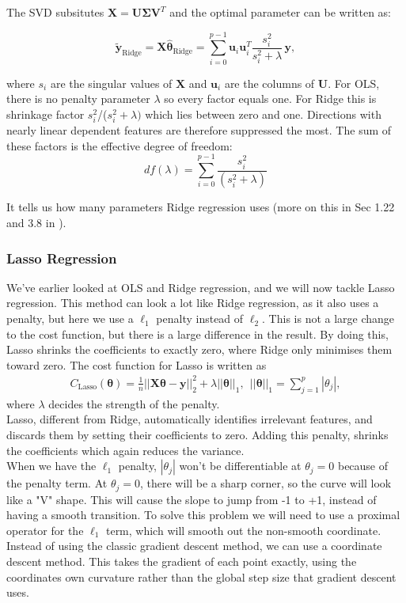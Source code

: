 \documentclass[reprint,english,notitlepage]{revtex4-2}  %
\begin{document}
The SVD subsitutes $\bm{X} = \bm{U\Sigma V}^T$ and the optimal parameter can be written as:

\begin{equation}\label{eq:SVD_ridge}
\tilde{\bm{y}}_\text{Ridge} = \bm{X}\hat{\bm{\theta}}_\text{Ridge} = \sum_{i=0}^{p-1} \bm{u}_i\bm{u}_i^T \frac{s_i^2}{s_i^2 + \lambda}\,  \bm{y},
\end{equation} 

where $s_i$ are the singular values of $\bm{X}$ and $\bm{u}_i$ are the columns of $\bm{U}$. For OLS, there is no penalty parameter $\lambda$ so every factor equals one. For Ridge this is shrinkage factor $s_i^2$/($s_i^2 + \lambda)$ which lies between zero and one. Directions with nearly linear dependent features are therefore suppressed the most. The sum of these factors is the effective degree of freedom:
\begin{equation*}
    df(\lambda) = \sum_{i=0}^{p-1} \frac{s_i^2}{(s_i^2 + \lambda)}
\end{equation*} 

It tells us how many parameters Ridge regression uses (more on this in Sec 1.22 and 3.8 in \cite{lecture_book}).

\subsubsection{Lasso Regression}


    We've earlier looked at OLS and Ridge regression, and we will now tackle Lasso regression. This method can look a lot like Ridge regression, as it also uses a penalty, but here we use a $\ell_1$ penalty instead of $\ell_2$. This is not a large change to the cost function, but there is a large difference in the result. By doing this, Lasso shrinks the coefficients to exactly zero, where Ridge only minimises them toward zero. The cost function for Lasso is written as
    \begin{align}\label{eq: lasso}
        C_{\text{Lasso}}(\bm{\theta}) = \frac{1}{n} ||\bm{X}\bm{\theta} - \bm{y}||_2^ 2 + \lambda ||\bm{\theta}||_1, \ \  ||\bm{\theta}||_1 =\sum_{j = 1}^{p} |\theta_j |, 
    \end{align}
    where $\lambda$ decides the strength of the penalty.\\
    Lasso, different from Ridge, automatically identifies irrelevant features, and discards them by setting their coefficients to zero. Adding this penalty, shrinks the coefficients which again reduces the variance. \\
    When we have the $\ell_1$ penalty, $|\theta_j|$ won't be differentiable at $\theta_j = 0$ because of the penalty term. At $\theta_j = 0$, there will be a sharp corner, so the curve will look like a "V" shape. This will cause the slope to jump from -1 to +1, instead of having a smooth transition. To solve this problem we will need to use a proximal operator for the $\ell_1$ term, which will smooth out the non-smooth coordinate.  \\
    Instead of using the classic gradient descent method, we can use a coordinate descent method. This takes the gradient of each point exactly, using the coordinates own curvature rather than the global step size that gradient descent uses. 
\end{document}
